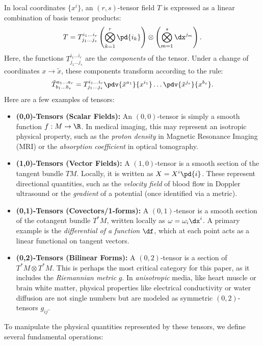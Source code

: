 In local coordinates $\{x^i\}$, an $(r,s)$-tensor field $T$ is expressed as a linear combination of basis tensor products:
\[%
  T = T^{i_1 \dots i_r}_{j_1 \dots j_s} \left(\bigotimes_{k=1}^r \pd{i_k}\right) \otimes \left(\bigotimes_{m=1}^s \dx^{j_m}\right)
.\]%
Here, the functions $T^{i_1 \dots i_r}_{j_1 \dots j_s}$ are the \emph{components} of the tensor. Under a change of coordinates $x \to \tilde{x}$, these components transform according to the rule:
\[%
  \tilde{T}^{a_1 \dots a_r}_{b_1 \dots b_s} = T^{i_1 \dots i_r}_{j_1 \dots j_s} \pdv{\tilde{x}^{a_1}}{x^{i_1}} \dots \pdv{\tilde{x}^{j_s}}{x^{b_s}}
.\]%
Here are a few examples of tensors:
\begin{example}\leavevmode
  \begin{itemize}
    \item \textbf{(0,0)-Tensors (Scalar Fields):} An $(0,0)$-tensor is simply a smooth function $f : M \to \R$. In medical imaging, this may represent an isotropic physical property, such as the \emph{proton density} in Magnetic Resonance Imaging (MRI) or the \emph{absorption coefficient} in optical tomography.

    \item \textbf{(1,0)-Tensors (Vector Fields):} A $(1,0)$-tensor is a smooth section of the tangent bundle $TM$. Locally, it is written as $X = X^i \pd{i}$. These represent directional quantities, such as the \emph{velocity field} of blood flow in Doppler ultrasound or the \emph{gradient} of a potential (once identified via a metric).

    \item \textbf{(0,1)-Tensors (Covectors/1-forms):} A $(0,1)$-tensor is a smooth section of the cotangent bundle $T^*M$, written locally as $\omega = \omega_i \dx^i$. A primary example is the \emph{differential of a function} $\df$, which at each point acts as a linear functional on tangent vectors.

    \item \textbf{(0,2)-Tensors (Bilinear Forms):} A $(0,2)$-tensor is a section of $T^*M \otimes T^*M$. This is perhaps the most critical category for this paper, as it includes the \emph{Riemannian metric} $g$. In \emph{anisotropic} media, like heart muscle or brain white matter, physical properties like electrical conductivity or water diffusion are not single numbers but are modeled as symmetric $(0,2)$-tensors $g_{ij}$.
  \end{itemize}
\end{example}

To manipulate the physical quantities represented by these tensors, we define several fundamental operations:

